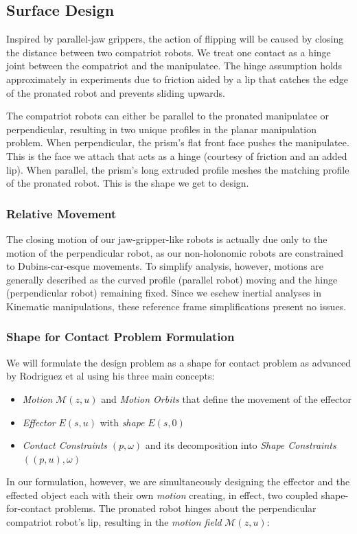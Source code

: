 \documentclass[letterpaper, 10 pt, conference]{ieeeconf}
\begin{document}
\subsection{Surface Design}
Inspired by parallel-jaw grippers, the action of flipping will be caused by closing the distance between two compatriot robots.
We treat one contact as a hinge joint between the compatriot and the manipulatee.
The hinge assumption holds approximately in experiments due to friction aided by a lip that catches the edge of the pronated robot and prevents sliding upwards.

The compatriot robots can either be parallel to the pronated manipulatee or perpendicular, resulting in two unique profiles in the planar manipulation problem.
When perpendicular, the prism's flat front face pushes the manipulatee. This is the face we attach that acts as a hinge (courtesy of friction and an added lip).
When parallel, the prism's long extruded profile meshes the matching profile of the pronated robot. This is the shape we get to design.

\subsubsection{Relative Movement}
The closing motion of our jaw-gripper-like robots is actually due only to the motion of the perpendicular robot, as our non-holonomic robots are constrained to Dubins-car-esque movements.
To simplify analysis, however, motions are generally described as the curved profile (parallel robot) moving and the hinge (perpendicular robot) remaining fixed.
Since we eschew inertial analyses in Kinematic manipulations, these reference frame simplifications present no issues.

\subsubsection{Shape for Contact Problem Formulation \cite{rodriguez2013effector}}
We will formulate the design problem as a shape for contact problem as advanced by Rodriguez et al\cite{rodriguez2013effector} using his three main concepts:
\begin{itemize}
  \item \textit{Motion} $\mathcal{M}(z,u)$ and \textit{Motion Orbits} that define the movement of the effector
  \item \textit{Effector} $E(s,u)$ with \textit{shape} $E(s,0)$
  \item \textit{Contact Constraints} $(p,\omega)$ and its decomposition into \textit{Shape Constraints} $((p,u),\omega)$
\end{itemize}
In our formulation, however, we are simultaneously designing the effector and the effected object each with their own \textit{motion} creating, in effect, two coupled shape-for-contact problems.
The pronated robot hinges about the perpendicular compatriot robot's lip, resulting in the \textit{motion field} $\mathcal{M}(z,u)$:
\end{document}
